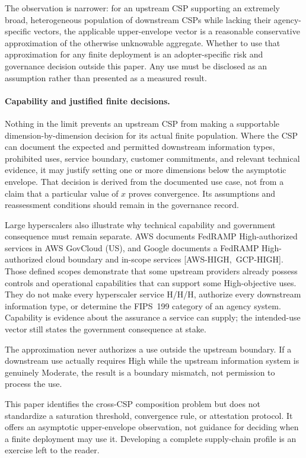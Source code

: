 \documentclass[11pt]{article}
\begin{document}
The observation is narrower: for an upstream CSP supporting an extremely broad,
heterogeneous population of downstream CSPs while lacking their agency-specific
vectors, the applicable upper-envelope vector is a reasonable conservative
approximation of the otherwise unknowable aggregate. Whether to use that
approximation for any finite deployment is an adopter-specific risk and governance
decision outside this paper. Any use must be disclosed as an assumption rather than
presented as a measured result.

\paragraph{Capability and justified finite decisions.}
Nothing in the limit prevents an upstream CSP from making a supportable
dimension-by-dimension decision for its actual finite population. Where the CSP can
document the expected and permitted downstream information types, prohibited uses,
service boundary, customer commitments, and relevant technical evidence, it may
justify setting one or more dimensions below the asymptotic envelope. That decision
is derived from the documented use case, not from a claim that a particular value of
$x$ proves convergence. Its assumptions and reassessment conditions should remain in
the governance record.

Large hyperscalers also illustrate why technical capability and government
consequence must remain separate. AWS documents FedRAMP High-authorized services in
AWS GovCloud (US), and Google documents a FedRAMP High-authorized cloud boundary and
in-scope services \mbox{[AWS-HIGH, GCP-HIGH]}. Those defined scopes demonstrate that
some upstream providers already possess controls and operational capabilities that
can support some High-objective uses. They do not make every hyperscaler service
H/H/H, authorize every downstream information type, or determine the FIPS~199
category of an agency system. Capability is evidence about the assurance a service
can supply; the intended-use vector still states the government consequence at
stake.

The approximation never authorizes a use outside the upstream boundary. If a
downstream use actually requires High while the upstream information system is
genuinely Moderate, the result is a boundary mismatch, not permission to process
the use.

\begin{boundarybox}
This paper identifies the cross-CSP composition problem but does not standardize a
saturation threshold, convergence rule, or attestation protocol. It offers an
asymptotic upper-envelope observation, not guidance for deciding when a finite
deployment may use it. Developing a complete supply-chain profile is an exercise
left to the reader.
\end{boundarybox}
\end{document}
